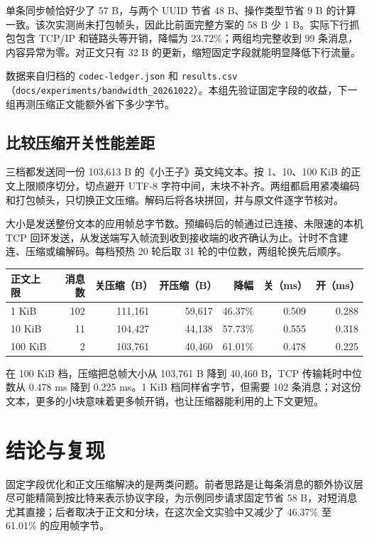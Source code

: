 \documentclass[UTF8,a4paper,11pt,fontset=fandol]{ctexart}
\newcommand{\code}[1]{\nolinkurl{#1}}
\begin{document}
单条同步帧恰好少了 57 B，与两个 UUID 节省 48 B、操作类型节省 9 B 的计算一致。该次实测尚未打包帧头，因此比前面完整方案的 58 B 少 1 B。实际下行抓包包含 TCP/IP 和链路头等开销，降幅为 23.72\%；两组均完整收到 99 条消息，内容异常为零。对正文只有 32 B 的更新，缩短固定字段就能明显降低下行流量。

数据来自归档的 \code{codec-ledger.json} 和 \code{results.csv}（\code{docs/experiments/bandwidth_20261022}）。本组先验证固定字段的收益，下一组再测压缩正文能额外省下多少字节。

\subsection{比较压缩开关性能差距}
三档都发送同一份 103,613 B 的《小王子》英文纯文本。按 1、10、100 KiB 的正文上限顺序切分，切点避开 UTF-8 字符中间，末块不补齐。两组都启用紧凑编码和打包帧头，只切换正文压缩。解码后将各块拼回，并与原文件逐字节核对。

大小是发送整份文本的应用帧总字节数。预编码后的帧通过已连接、未限速的本机 TCP 回环发送，从发送端写入帧流到收到接收端的收齐确认为止。计时不含建连、压缩或编解码。每档预热 20 轮后取 31 轮的中位数，两组轮换先后顺序。

\begin{center}\small\begin{tabular}{lrrrrrr}\toprule
正文上限 & 消息数 & 关压缩（B） & 开压缩（B） & 降幅 & 关（ms） & 开（ms）\\\midrule
1 KiB & 102 & 111,161 & 59,617 & 46.37\% & 0.509 & 0.288\\
10 KiB & 11 & 104,427 & 44,138 & 57.73\% & 0.555 & 0.318\\
100 KiB & 2 & 103,761 & 40,460 & 61.01\% & 0.478 & 0.225\\
\bottomrule
\end{tabular}\end{center}

在 100 KiB 档，压缩把总帧大小从 103,761 B 降到 40,460 B，TCP 传输耗时中位数从 0.478 ms 降到 0.225 ms。1 KiB 档同样省字节，但需要 102 条消息；对这份文本，更多的小块意味着更多帧开销，也让压缩器能利用的上下文更短。

\newpage
\section{结论与复现}
固定字段优化和正文压缩解决的是两类问题。前者思路是让每条消息的额外协议层尽可能精简到按比特来表示协议字段，为示例同步请求固定节省 58 B，对短消息尤其直接；后者取决于正文和分块，在这次全文实验中又减少了 46.37\% 至 61.01\% 的应用帧字节。
\end{document}
